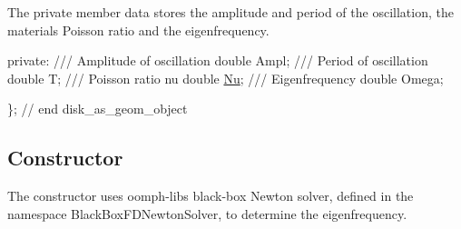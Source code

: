 The private member data stores the amplitude and period of the oscillation, the material\textquotesingle{}s Poisson ratio and the eigenfrequency.


\begin{DoxyCodeInclude}

\textcolor{keyword}{private}:
\textcolor{comment}{}
\textcolor{comment}{ /// Amplitude of oscillation}
\textcolor{comment}{} \textcolor{keywordtype}{double} Ampl;
\textcolor{comment}{}
\textcolor{comment}{ /// Period of oscillation}
\textcolor{comment}{} \textcolor{keywordtype}{double} T;
\textcolor{comment}{}
\textcolor{comment}{ /// Poisson ratio nu}
\textcolor{comment}{} \textcolor{keywordtype}{double} \hyperlink{namespaceGlobal__Physical__Variables_a3962c36313826b19f216f6bbbdd6a477}{Nu};
\textcolor{comment}{}
\textcolor{comment}{ /// Eigenfrequency}
\textcolor{comment}{} \textcolor{keywordtype}{double} Omega;

\}; \textcolor{comment}{// end disk\_as\_geom\_object}

\end{DoxyCodeInclude}




\hypertarget{index_ic_constructor}{}\subsection{Constructor}\label{index_ic_constructor}
The constructor uses {\ttfamily oomph-\/lib\textquotesingle{}s} black-\/box Newton solver, defined in the namespace {\ttfamily Black\+Box\+F\+D\+Newton\+Solver}, to determine the eigenfrequency.

